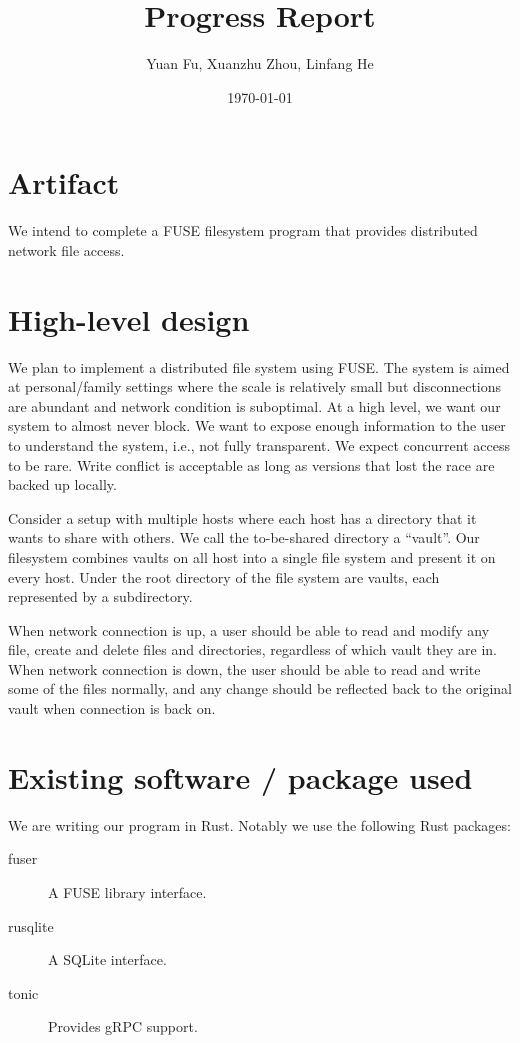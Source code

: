\documentclass[a4paper,11pt,twoside,twocolumn]{extarticle}
\author{Yuan Fu, Xuanzhu Zhou, Linfang He}
\date{\today}
\title{Progress Report}
\begin{document}
\maketitle
\tableofcontents


\section{Artifact}
\label{sec:org921abd3}

We intend to complete a FUSE filesystem program that provides distributed network file access.

\section{High-level design}
\label{sec:org1b46fef}

We plan to implement a distributed file system using FUSE. The system is aimed at personal/family settings where the scale is relatively small but disconnections are abundant and network condition is suboptimal. At a high level, we want our system to almost never block. We want to expose enough information to the user to understand the system, i.e., not fully transparent. We expect concurrent access to be rare. Write conflict is acceptable as long as versions that lost the race are backed up locally.

Consider a setup with multiple hosts where each host has a directory that it wants to share with others. We call the to-be-shared directory a “vault”. Our filesystem combines vaults on all host into a single file system and present it on every host. Under the root directory of the file system are vaults, each represented by a subdirectory.

When network connection is up, a user should be able to read and modify any file, create and delete files and directories, regardless of which vault they are in. When network connection is down, the user should be able to read and write some of the files normally, and any change should be reflected back to the original vault when connection is back on.

\section{Existing software / package used}
\label{sec:org4c98541}

We are writing our program in Rust. Notably we use the following Rust packages:
\begin{description}
\item[{fuser}] A FUSE library interface.
\item[{rusqlite}] A SQLite interface.
\item[{tonic}] Provides gRPC support.
\end{description}
\end{document}
